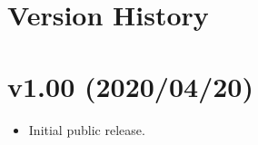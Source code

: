 \clearpage
\section{Version History}%

\section*{v1.00 (2020/04/20)}
\begin{itemize}
\item Initial public release.
\end{itemize}
